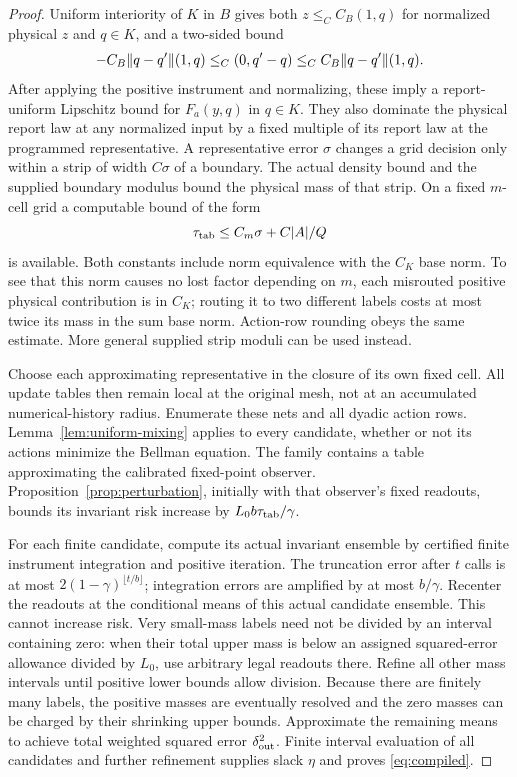 \begin{proof}
Uniform interiority of $K$ in $B$ gives both $z\le_C C_B(1,q)$ for normalized physical $z$ and $q\in K$, and a two-sided bound
\[
 -C_B\lVert q-q'\rVert(1,q)\le_C(0,q'-q)
       \le_C C_B\lVert q-q'\rVert(1,q).
\]
After applying the positive instrument and normalizing, these imply a report-uniform Lipschitz bound for $F_a(y,q)$ in $q\in K$. They also dominate the physical report law at any normalized input by a fixed multiple of its report law at the programmed representative. A representative error $\sigma$ changes a grid decision only within a strip of width $C\sigma$ of a boundary. The actual density bound and the supplied boundary modulus bound the physical mass of that strip. On a fixed $m$-cell grid a computable bound of the form
\[
 \tau_{\rm tab}\le C_m\sigma+C|A|/Q
\]
is available. Both constants include norm equivalence with the $C_K$ base norm. To see that this norm causes no lost factor depending on $m$, each misrouted positive physical contribution is in $C_K$; routing it to two different labels costs at most twice its mass in the sum base norm. Action-row rounding obeys the same estimate. More general supplied strip moduli can be used instead.

Choose each approximating representative in the closure of its own fixed cell. All update tables then remain local at the original mesh, not at an accumulated numerical-history radius. Enumerate these nets and all dyadic action rows. Lemma~\ref{lem:uniform-mixing} applies to every candidate, whether or not its actions minimize the Bellman equation. The family contains a table approximating the calibrated fixed-point observer. Proposition~\ref{prop:perturbation}, initially with that observer's fixed readouts, bounds its invariant risk increase by $L_0b\tau_{\rm tab}/\gamma$.

For each finite candidate, compute its actual invariant ensemble by certified finite instrument integration and positive iteration. The truncation error after $t$ calls is at most $2(1-\gamma)^{\lfloor t/b\rfloor}$; integration errors are amplified by at most $b/\gamma$. Recenter the readouts at the conditional means of this actual candidate ensemble. This cannot increase risk. Very small-mass labels need not be divided by an interval containing zero: when their total upper mass is below an assigned squared-error allowance divided by $L_0$, use arbitrary legal readouts there. Refine all other mass intervals until positive lower bounds allow division. Because there are finitely many labels, the positive masses are eventually resolved and the zero masses can be charged by their shrinking upper bounds. Approximate the remaining means to achieve total weighted squared error $\delta_{\rm out}^2$. Finite interval evaluation of all candidates and further refinement supplies slack $\eta$ and proves \eqref{eq:compiled}.


\end{proof}

